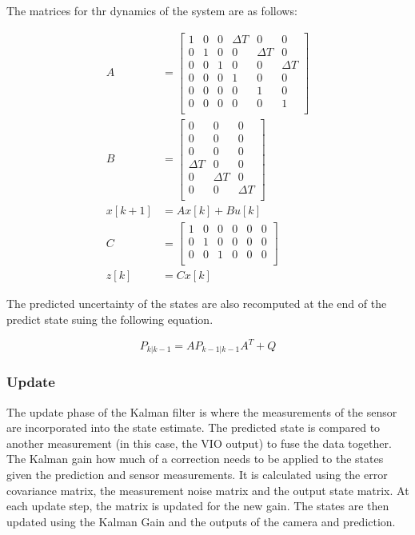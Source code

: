 \documentclass[bare_jrnl_transmag]{subfiles}
\begin{document}
The matrices for thr dynamics of the system are as follows:

\begin{align*}
    A &= 
    \begin{bmatrix}
    1 & 0 & 0 & \Delta T & 0 & 0 \\
    0 & 1 & 0 & 0 & \Delta T & 0 \\
    0 & 0 & 1 & 0 & 0 & \Delta T \\
    0 & 0 & 0 & 1 & 0 & 0 \\
    0 & 0 & 0 & 0 & 1 & 0 \\
    0 & 0 & 0 & 0 & 0 & 1 \\
    \end{bmatrix}
    \\[1em]
    B &= 
    \begin{bmatrix}
    0 & 0 & 0 \\
    0 & 0 & 0 \\
    0 & 0 & 0 \\
    \Delta T & 0 & 0 \\
    0 & \Delta T & 0 \\
    0 & 0 & \Delta T \\
    \end{bmatrix}
    \\[1em]
    x[k+1] &= A x[k] + B u[k]
    \\[1em]
    C &= 
    \begin{bmatrix}
    1 & 0 & 0 & 0 & 0 & 0 \\
    0 & 1 & 0 & 0 & 0 & 0 \\
    0 & 0 & 1 & 0 & 0 & 0 \\
    \end{bmatrix}
    \\[1em]
    z[k] &= C x[k]
\end{align*}

The predicted uncertainty of the states are also recomputed at the end of the predict state suing the following equation.

\begin{equation*}
    P_{k|k-1} = A P_{k-1|k-1} A^T + Q
\end{equation*}
\newline

\subsubsection{Update}
The update phase of the Kalman filter is where the measurements of the sensor are incorporated into the state estimate. The predicted state is compared to another measurement (in this case, the VIO output) to fuse the data together. 
The Kalman gain how much of a correction needs to be applied to the states given the prediction and sensor measurements. It is calculated using the error covariance matrix, the measurement noise matrix and the output state matrix. 
At each update step, the matrix is updated for the new gain. The states are then updated using the Kalman Gain and the outputs of the camera and prediction.
\end{document}
